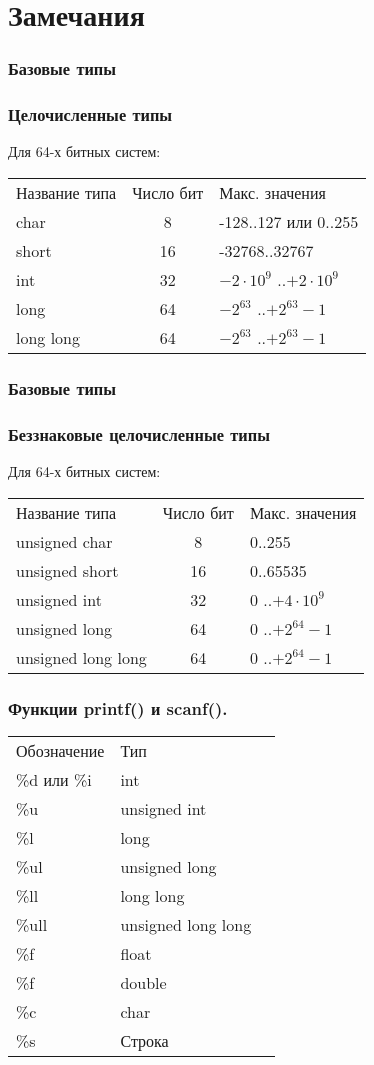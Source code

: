 \documentclass[12pt,pdf,hyperref={unicode}]{beamer}
\begin{document}
\section{Замечания}



\begin{frame}
\frametitle{Базовые типы}
\frametitle{Целочисленные типы} 
Для 64-х битных систем:
\begin{center}
\begin{tabular}{ l c l }
  Название типа & Число бит & Макс. значения \\
  char & 8 & -128..127 или 0..255 \\
  short & 16 & -32768..32767 \\
  int & 32 & $-2 \cdot 10^9$ ..$+2 \cdot 10^9$ \\
  long & 64& $-2^{63}$ ..$+2^{63}-1$ \\
  long long & 64 & $-2^{63}$ ..$+2^{63}-1$ \\
\end{tabular}
\end{center}
\end{frame}

\begin{frame}
\frametitle{Базовые типы}
\frametitle{Беззнаковые целочисленные типы} 
Для 64-х битных систем:
\begin{center}
\begin{tabular}{ l c l }
  Название типа & Число бит & Макс. значения \\
  unsigned char & 8 & 0..255 \\
  unsigned short & 16 & 0..65535 \\
  unsigned int & 32 & $0$ ..$+4 \cdot 10^9$ \\
  unsigned long & 64 & $0$ ..$+2^{64}-1$ \\
  unsigned long long & 64 & $0$ ..$+2^{64}-1$ \\
\end{tabular}
\end{center}
\end{frame}



\begin{frame}
\frametitle{Функции printf() и scanf().}
\begin{center}
\begin{tabular}{ l l l }
  Обозначение & Тип \\
  \%d или \%i & int \\
  \%u & unsigned int \\
  \%l & long \\
  \%ul & unsigned long \\
  \%ll & long long \\
  \%ull & unsigned long long \\
  \%f & float \\
  \%f & double \\
  \%c & char \\
  \%s & Строка\\
\end{tabular}
\end{center}
\end{frame}
\end{document}
